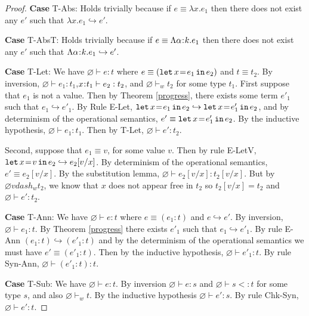 \documentclass[11pt]{article}
\newcommand{\al}{\alpha}
\newcommand{\bind}{\hspace{0.05em}{:}\hspace{0.05em}} %
\newcommand{\step}{\hookrightarrow}
\newcommand{\letin}[3]{{\tt let}\,#1\hspace{0.1em}{=}\hspace{0.1em}#2\,{\tt in}\,#3}
\begin{document}
\begin{proof}
{\bf Case} {\sc T-Abs}: Holds trivially because if $e \equiv \lambda x.e_1$ then there does not exist any $e'$ such that $\lambda x.e_1 \hookrightarrow e'$.

{\bf Case} {\sc T-AbsT}: Holds trivially because if $e \equiv \Lambda\al\bind k.e_1$ then there does not exist any $e'$ such that $\Lambda\al\bind k.e_1 \hookrightarrow e'$.

{\bf Case} {\sc T-Let}: We have $\varnothing \vdash e : t$ where $e \equiv (\letin{x}{e_1}{e_2})$ and $t \equiv t_2$. By inversion,
$\varnothing \vdash e_1 : t_1$,\quad $x\bind t_1\vdash e_2 : t_2$, and $\varnothing \vdash_w t_2$ for some type $t_1$. 
First suppose that $e_1$ is not a value. Then by Theorem \ref{progress}, there exists some term $e'_1$ such that $e_1 \step e'_1$. By Rule {\sc E-Let}, $\letin{x}{e_1}{e_2} \step \letin{x}{e'_1}{e_2}$, and by determinism of the operational semantics, $e' \equiv \letin{x}{e'_1}{e_2}$. By the inductive hypothesis, $\varnothing \vdash e_1 : t_1$. Then by {\sc T-Let}, $\varnothing \vdash e' : t_2$.

Second, suppose that $e_1 \equiv v$, for some value $v$. Then by rule {\sc E-LetV}, $\letin{x}{v}{e_2}\step e_2[v/x]$. By determinism of the operational semantics, $e' \equiv e_2[v/x]$. By the substitution lemma, $\varnothing \vdash e_2[v/x] : t_2[v/x]$. But by $\varnothing vdash_w t_2$, we know that $x$ does not appear free in $t_2$ so $t_2[v/x] = t_2$ and $\varnothing \vdash e' : t_2$.

{\bf Case} {\sc T-Ann}: We have $\varnothing \vdash e : t$ where $e \equiv (e_1 : t)$ and $e \hookrightarrow e'$. By inversion,
$\varnothing \vdash e_1 : t$. By Theorem \ref{progress} there exists $e'_1$ such that $e_1 \hookrightarrow e'_1$. By rule {\sc E-Ann} $(e_1 : t) \hookrightarrow (e'_1 : t)$ and by the determinism of the operational semantics we must have $e' \equiv (e'_1 : t)$. Then by the inductive hypothesis, $\varnothing \vdash e'_1 : t$. By rule {\sc Syn-Ann}, $\varnothing \vdash (e'_1 : t) : t$. 

{\bf Case} {\sc T-Sub}: We have $\varnothing \vdash e : t$. By inversion $\varnothing \vdash e : s$ and $\varnothing \vdash s <: t$ for some type $s$, and also $\varnothing \vdash_w t$. By the inductive hypothesis $\varnothing \vdash e' : s$. By rule {\sc Chk-Syn}, $\varnothing \vdash e' : t$.

\end{proof}
\end{document}
